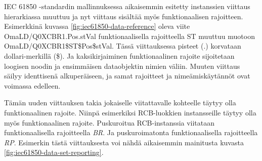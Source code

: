 IEC 61850 -standardin mallinnuksessa aikaisemmin esitetty instanssien viittaus hierarkiassa muuttuu ja nyt viittaus sisältää myös funktionaalisen rajoitteen. Esimerkkinä kuvassa \ref{fig:iec61850-data-reference} oleva viite OmaLD/Q0XCBR1.Pos.stVal funktionaalisella rajoitteella ST muuttuu muotoon OmaLD/Q0XCBR1\$ST\$Pos\$stVal. Tässä viittauksessa pisteet (.) korvataan dollari-merkillä (\$). Ja kaksikirjaiminen funktionaalinen rajoite sijoitetaan loogisen noodin ja ensimmäisen dataobjektin nimien väliin. Muuten viittaus säilyy identtisenä alkuperäiseen, ja samat rajoitteet ja nimeämiskäytännöt ovat voimassa edelleen. \mbox{\cite[s.~34--35, 111]{IEC61850-8-1}}

Tämän uuden viittauksen takia jokaiselle viitattavalle kohteelle täytyy olla funktionaalinen rajoite. Niinpä esimerkiksi RCB-luokkien instansseille täytyy olla myös funktionaalinen rajoite. Puskuroitua RCB-instanssia viitataan funktionaalisella rajoitteella \emph{BR}. Ja puskuroimatonta funktionaalisella rajoitteella \emph{RP}. Esimerkin tästä viittauksesta voi nähdä aikaisemmin mainitusta kuvasta \ref{fig:iec61850-data-set-reporting}. \mbox{\cite[s.~32--34, 75]{IEC61850-8-1}}